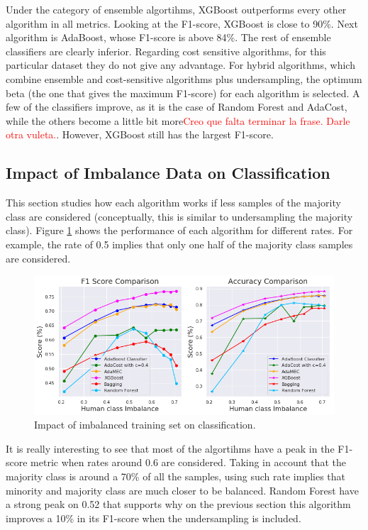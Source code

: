 \documentclass[conference]{IEEEtran}
\begin{document}
Under the category of ensemble algortihms, XGBoost outperforms every other algorithm in all metrics. Looking at the F1-score, XGBoost is close to 90\%. Next algorithm is AdaBoost, whose F1-score is above 84\%. The rest of ensemble classifiers are clearly inferior. Regarding cost sensitive algorithms, for this particular dataset they do not give any advantage. For hybrid algorithms, which combine ensemble and cost-sensitive algorithms plus undersampling, the optimum beta (the one that gives the maximum F1-score) for each algorithm is selected. A few of the classifiers improve, as it is the case of Random Forest and AdaCost, while the others become a little bit more\textcolor{red}{Creo que falta terminar la frase. Darle otra vuleta.}. However, XGBoost still has the largest F1-score.

\subsection{Impact of Imbalance Data on Classification}

This section studies how each algorithm works if less samples of the majority class are considered (conceptually, this is similar to undersampling the majority class). Figure \ref{Fig:ImbalanceComparison} shows the performance of each algorithm for different rates. For example, the rate of 0.5 implies that only one half of the majority class samples are considered.

\begin{figure}[htbp]
\centerline{\includegraphics[scale=0.35]{pictures/Imbalance_Comparison.png}}
\caption{Impact of imbalanced training set on classification.}
\label{Fig:ImbalanceComparison}
\end{figure}

It is really interesting to see that most of the algortihms have a peak in the F1-score metric when rates around 0.6 are considered. Taking in account that the majority class is around a 70\% of all the samples, using such rate implies that minority and majority class are much closer to be balanced. Random Forest have a strong peak on 0.52 that supports why on the previous section this algorithm improves a 10\% in its F1-score when the undersampling is included. 
\end{document}
